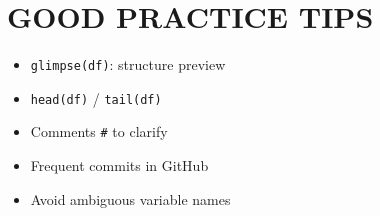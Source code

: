 \documentclass[
  english,
  8pt,
  letterpaper,
  DIV=11,
  numbers=noendperiod]{scrartcl}
\providecommand{\tightlist}{%
  \setlength{\itemsep}{0pt}\setlength{\parskip}{0pt}}
\begin{document}
\section{ GOOD PRACTICE TIPS}\label{good-practice-tips}

\begin{itemize}
\tightlist
\item
  \texttt{glimpse(df)}: structure preview
\item
  \texttt{head(df)} / \texttt{tail(df)}
\item
  Comments \texttt{\#} to clarify
\item
  Frequent commits in GitHub
\item
  Avoid ambiguous variable names
\end{itemize}
\end{document}
